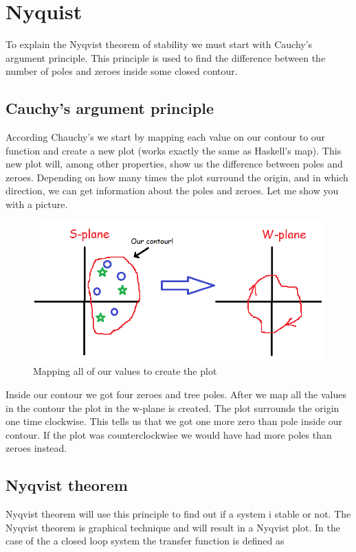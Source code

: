 \section{Nyquist}
To explain the Nyqvist theorem of stability we must start with Cauchy's argument principle. This principle is used to find the difference between the number of poles and zeroes inside some closed contour.

\subsection{Cauchy's argument principle}
According Chauchy's we start by mapping each value on our contour to our function and create a new plot (works exactly the same as Haskell's map). This new plot will, among other properties, show us the difference between poles and zeroes. Depending on how many times the plot surround the origin, and in which direction, we can get information about the poles and zeroes. Let me show you with a picture.

\begin{figure}[h!]
    \centering
    \includegraphics[scale= 0.4]{Images/sw.PNG}
    \caption{Mapping all of our values to create the plot}
    \label{Cauchy}
\end{figure}

Inside our contour we got four zeroes and tree poles. After we map all the values in the contour the plot in the w-plane is created. The plot surrounds the origin one time clockwise. This tells us that we got one more zero than pole inside our contour. If the plot was counterclockwise we would have had more poles than zeroes instead.

\subsection{Nyqvist theorem}
Nyqvist theorem will use this principle to find out if a system i stable or not. The Nyqvist theorem is graphical technique and will result in a Nyqvist plot. In the case of the a closed loop system the transfer function is defined as


